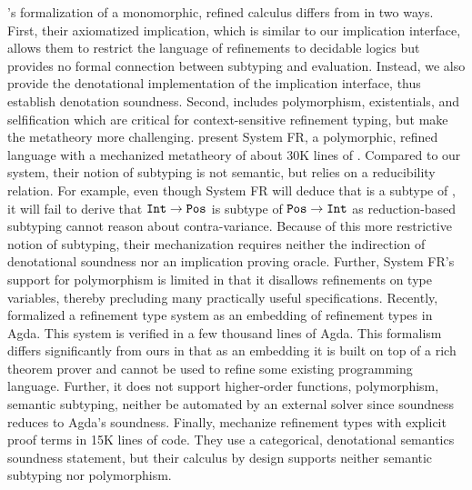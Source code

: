 %
%
\citet{LehmannTanter}'s \coq formalization
of a monomorphic, refined calculus
differs from \sysrf
in two ways.
%
First, their axiomatized implication, 
which is similar to our implication interface,
allows them to 
restrict the language of refinements
to decidable logics but provides no formal connection 
between subtyping and evaluation.
%
Instead, we also provide the denotational 
implementation of the implication interface, 
thus establish denotation soundness.
%
Second, \sysrf includes polymorphism,
existentials, and selfification
which are critical for %
context-sensitive refinement typing,
but make the metatheory more challenging.
%
%
\citet{kuncak-stainless} present System FR,
a polymorphic, refined language
with a mechanized metatheory
of about 30K lines of \coq.
%
Compared to our system, their notion
of subtyping is not semantic, but relies on
a reducibility relation.
%
For example, even though System FR
will deduce that \tpos is a subtype of
\tint, it will fail to derive that
$\texttt{Int} \rightarrow \texttt{Pos}$ is subtype
of  $\texttt{Pos} \rightarrow \texttt{Int}$
as reduction-based subtyping
cannot reason about contra-variance.
%
Because of this more restrictive notion
of subtyping, their mechanization
requires neither the indirection of
denotational soundness nor 
an implication proving oracle.
%
Further, System FR's support
for polymorphism is limited
in that it disallows refinements
on type variables, thereby
precluding many practically
useful specifications. %
%
  Recently, \citet{10.1145/3546196.3550162}
  formalized a 
  refinement type system 
  as an embedding of refinement types in Agda.
  This system is verified 
  in a few thousand lines of Agda.
  This formalism differs significantly from ours in that
  as an embedding it is built on top of a rich theorem prover 
  and cannot be used to refine some existing programming language.
  Further, 
  it does not support higher-order
  functions, polymorphism, 
  semantic subtyping, neither be automated by an external solver 
  since soundness reduces to Agda's soundness.
%
Finally, \citet{explicit} mechanize refinement types
with explicit proof terms in 15K lines of \lean code. 
They use a categorical, denotational semantics 
soundness statement, but their calculus 
by design supports neither semantic subtyping
nor polymorphism. 

